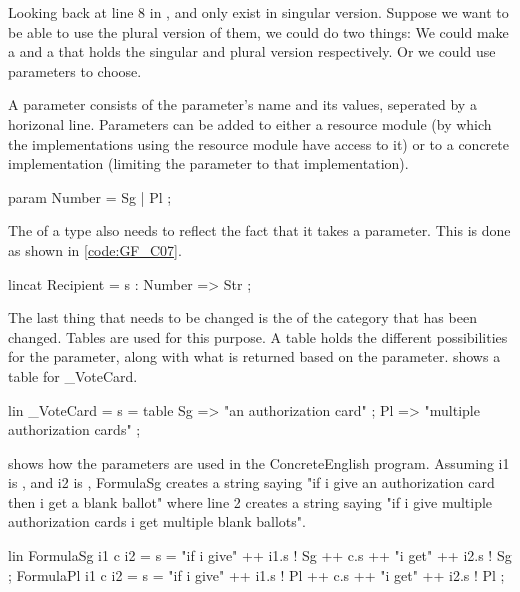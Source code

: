 Looking back at line 8 in ,  and  only exist in singular version. Suppose we want to be able to use the plural version of them, we could do two things: We could make a  and a  that holds the singular and plural version respectively. Or we could use parameters to choose.

A parameter consists of the parameter's name and its values, seperated by a horizonal line. Parameters can be added to either a resource module (by which the implementations using the resource module have access to it) or to a concrete implementation (limiting the parameter to that implementation).

\begin{lstgf}
param 
    Number = Sg | Pl ;
\end{lstgf}

The  of a type also needs to reflect the fact that it takes a parameter. This is done as shown in \ref{code:GF_C07}.

\begin{lstgf}
lincat 
    Recipient = {s : Number => Str} ;
\end{lstgf}

The last thing that needs to be changed is the  of the category that has been changed. Tables are used for this purpose. A table holds the different possibilities for the parameter, along with what is returned based on the parameter.  shows a table for \_VoteCard.

\begin{lstgf}
lin 
    _VoteCard = {
        s = table {
            Sg => "an authorization card" ;
            Pl => "multiple authorization cards"
        }
    } ;
\end{lstgf}

 shows how the parameters are used in the ConcreteEnglish program. Assuming i1 is , and i2 is , FormulaSg creates a string saying "if i give an authorization card then i get a blank ballot" where line 2 creates a string saying "if i give multiple authorization cards i get multiple blank ballots".

\begin{lstgf}
lin
    FormulaSg i1 c i2 = {s = "if i give" ++ i1.s ! Sg ++ c.s ++ "i get" ++ i2.s ! Sg} ;
    FormulaPl i1 c i2 = {s = "if i give" ++ i1.s ! Pl ++ c.s ++ "i get" ++ i2.s ! Pl} ;
\end{lstgf}

